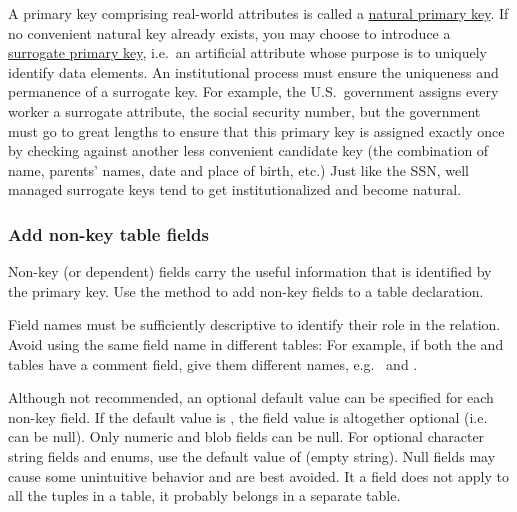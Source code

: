 \documentclass[10pt]{article}
\begin{document}
A primary key comprising real-world attributes is called a \href{http://en.wikipedia.org/wiki/Natural_key}{natural primary key}.  If no convenient natural key already exists, you may choose to introduce a \href{http://en.wikipedia.org/wiki/Surrogate_key}{surrogate primary key}, i.e.~an artificial attribute whose purpose is to uniquely identify data elements.  An institutional process must ensure the uniqueness and permanence of a surrogate key. For example, the U.S.~government assigns every worker a surrogate attribute, the social security number, but the government must go to great lengths to ensure that this primary key is assigned exactly once by checking against another less convenient candidate key (the combination of name, parents' names, date and place of birth, etc.)  Just like the SSN, well managed surrogate keys tend to get institutionalized and become natural.  


\subsubsection{Add non-key table fields}
Non-key (or dependent) fields carry the useful information that is identified by the primary key.  Use the  method to add non-key fields to a table declaration.

Field names must be sufficiently descriptive to identify their role in the relation.  Avoid using the same field name in different tables: For example, if both the   and  tables have a comment field, give them different names, e.g.~ and .

Although not recommended, an optional default value can be specified for each non-key field. If the default value is \mcode{[]}, the field value is altogether optional (i.e. can be null).  Only numeric and blob fields can be null.  For optional character string fields and enums, use the default value of  (empty string).  Null fields may cause some unintuitive behavior and are best avoided.  It a field does not apply to all the tuples in a table, it probably belongs in a separate table.
\end{document}
